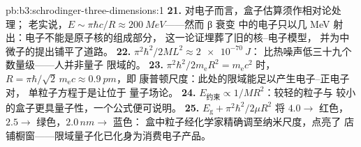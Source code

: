 \begin{solution}{pb:b3:schrodinger-three-dimensions:1}
\textbf{21.} 对电子而言，盒子估算须作相对论处理；
老实说，$E \sim \pi\hbar c/R \approx \qty{200}{MeV}$——然而 β 衰变
中的电子只以几 MeV 射出：电子不能是原子核的组成部分，
这一论证埋葬了旧的核–电子模型，
并为中微子的提出铺平了道路。
\textbf{22.} $\pi^2\hbar^2/2ML^2 \approx \qty{2e-70}{J}$：
比热噪声低三十九个数量级——人并非量子
限域的。
\textbf{23.} $\pi^2\hbar^2/2m_{\text{e}}R^2 = m_{\text{e}}c^2$ 时，
$R = \pi\hbar/\sqrt2\,m_{\text{e}}c \approx \qty{0.9}{pm}$，即
康普顿尺度：此处的限域能足以产生电子–正电子对，
单粒子方程于是让位于
量子场论。
\textbf{24.} $E_{\text{约束}} \propto 1/MR^2$：较轻的粒子与
较小的盒子更具量子性，一个公式便可说明。
\textbf{25.} $E_{\text{g}} + \pi^2\hbar^2/2\mu R^2$ 将 $4.0 \to$
红色，$2.5 \to$ 绿色，$2.0\,\unit{nm} \to$ 蓝色：
盒中粒子经化学家精确调至纳米尺度，点亮了
店铺橱窗——限域量子化已化身为消费电子产品。
\end{solution}
